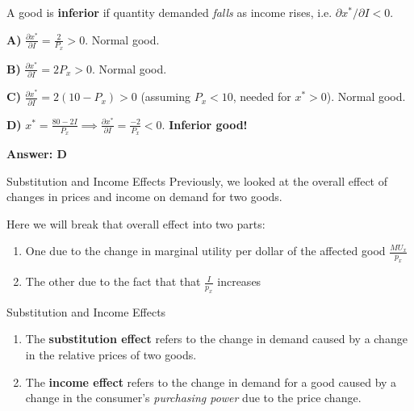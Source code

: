 \documentclass{beamer}
\begin{document}
\begin{frame}

  \bigskip
  A good is \textbf{inferior} if quantity demanded \emph{falls} as income rises, i.e. $\partial x^*/\partial I < 0$.

  \bigskip
  \textbf{A)} $\frac{\partial x^*}{\partial I} = \frac{2}{P_x} > 0$. Normal good.

  \bigskip
  \textbf{B)} $\frac{\partial x^*}{\partial I} = 2P_x > 0$. Normal good.

  \bigskip
  \textbf{C)} $\frac{\partial x^*}{\partial I} = 2(10-P_x) > 0$ (assuming $P_x < 10$, needed for $x^*>0$). Normal good.

  \bigskip
  \textbf{D)} $x^* = \frac{80-2I}{P_x} \implies \frac{\partial x^*}{\partial I} = \frac{-2}{P_x} < 0$. \textbf{Inferior good!}

  \bigskip
  \textbf{Answer: D}
\end{frame}

\begin{frame}{Substitution and Income Effects}
  Previously, we looked at the overall effect of changes in prices and income on demand for two goods.

  Here we will break that overall effect into two parts:

  \begin{enumerate}
    \item One due to the change in marginal utility per dollar of the affected good $\frac{MU_x}{p_x}$ 
    
    \item The other due to the fact that that $\frac{I}{p_x}$ increases
  \end{enumerate}
  
\end{frame}

\begin{frame}{Substitution and Income Effects}
  \begin{enumerate}
    \item The \textbf{substitution effect} refers to the change in demand caused by a change in the relative prices of two goods.

    \item The \textbf{income effect} refers to the change in demand for a good caused by a change in the consumer's  \textit{purchasing power} due to the price change.
  \end{enumerate}
\end{frame}
\end{document}
